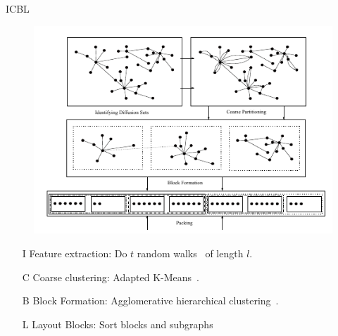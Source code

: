 \documentclass[rgb]{beamer}
\begin{document}
        \begin{frame}[allowframebreaks]{ICBL}
        \vspace{-3.3em}
            \begin{figure}
                \begin{center}
                \includegraphics[keepaspectratio, height=\textheight, width=\textwidth]{img/icbl.png}
                \end{center}
            \end{figure}
            
            \framebreak
            \begin{enumerate}
             \item[I ] Feature extraction: Do $t$ random walks~\autocite{fouss2007random} of length $l$. 
             \item[C] Coarse clustering: Adapted K-Means~\autocite{lloyd1982least}.
             \item[B] Block Formation: Agglomerative hierarchical clustering~\autocite{hac}.
             \item[L] Layout Blocks: Sort blocks and subgraphs
            \end{enumerate}

            
        \end{frame}
        
\end{document}

